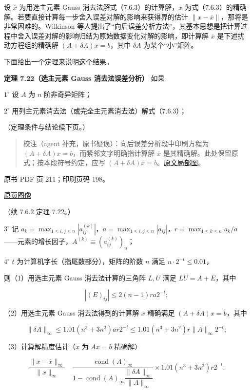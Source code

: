 设 \(\overline x\) 为用选主元素 Gauss 消去法解式（7.6.3）的计算解，\(x\) 为式（7.6.3）的精确解。若要直接计算每一步舍入误差对解的影响来获得界的估计 \(\|x-\overline x\|\)，那将是非常困难的。Wilkinson 等人提出了``向后误差分析方法''，其基本思想是把计算过程中舍入误差对解的影响归结为原始数据变化对解的影响，即计算解 \(\overline x\) 是下述扰动方程组的精确解 \((A+\delta A)x=b\)，其中 \(\delta A\) 为某个``小''矩阵。

下面给出一个定理来说明这个结果。

\textbf{定理 7.22（选主元素 Gauss 消去法误差分析）} 如果

\(1^\circ\) 设 \(A\) 为 \(n\) 阶非奇异矩阵；

\(2^\circ\) 用列主元素消去法（或完全主元素消去法）解式（7.6.3）；

（定理条件与结论续下页。）

\begin{quote}
校注（agent 补充，原书疑误）：向后误差分析段中印刷方程为 \((A+\delta A)x=b\)，而紧邻文字明确指计算解 \(\overline x\) 是其精确解。此处保留原式；按本段符号约定，应写 \((A+\delta A)\overline x=b\)。\href{verified/assets/ch07b/210-backward-error.png}{原文局部图}。
\end{quote}

\clearpage

原书 PDF 页 211；印刷页码 198。

\href{source-images/pdf-211.jpeg}{原页图像}

（续 7.6.2 定理 7.22。）

\(3^\circ\) 记 \(a_k=\max_{1\leqslant i,j\leqslant n}|a_{ij}^{(k)}|\)，\(a=\max_{1\leqslant i,j\leqslant n}|a_{ij}|\)，\(r=\max_{1\leqslant k\leqslant n}a_k/a\)------元素的增长因子，\(A^{(k)}\equiv(a_{ij}^{(k)})_n\)；

\(4^\circ\) \(t\) 为计算机字长（指尾数部分），矩阵的阶数 \(n\) 满足 \(n\cdot2^{-t}\leqslant0.01\)，

则（1）用选主元素 Gauss 消去法计算的三角阵 \(L,U\) 满足 \(LU=A+E\)，其中

\[
|(E)_{ij}|\leqslant2(n-1)ra2^{-t};
\]

（2）用选主元素 Gauss 消去法得到的计算解 \(\overline x\) 精确满足 \((A+\delta A)x=b\)，其中

\[
\|\delta A\|_\infty\leqslant1.01(n^3+3n^2)ar2^{-t}\leqslant1.01(n^3+3n^2)r\|A\|_\infty2^{-t};
\]

（3）计算解精度估计（\(x\) 为 \(Ax=b\) 精确解）

\[
\frac{\|x-\overline x\|_\infty}{\|x\|_\infty}
\quad
\frac{\operatorname{cond}(A)_\infty}
{1-\operatorname{cond}(A)_\infty\dfrac{\|\delta A\|_\infty}{\|A\|_\infty}}
\times1.01(n^3+3n^2)r2^{-t}.
\tag{7.6.14}
\]

